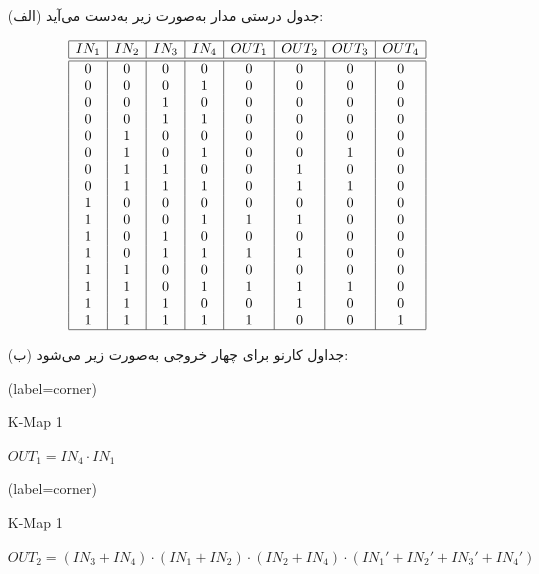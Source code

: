 \begin{enumerate}
	\item [(الف)]
	جدول درستی مدار به‌صورت زیر به‌دست می‌آید:
	
	
	\begin{latin}
		\[
		\begin{array}{|c|c|c|c|c|c|c|c|c|}
			\hline
			IN_1 & IN_2 & IN_3 & IN_4 & OUT_1 & OUT_2 & OUT_3 & OUT_4 \\
			\hline\hline
			0 & 0 & 0 & 0 & 0 & 0 & 0 & 0 \\
			0 & 0 & 0 & 1 & 0 & 0 & 0 & 0 \\
			0 & 0 & 1 & 0 & 0 & 0 & 0 & 0 \\
			0 & 0 & 1 & 1 & 0 & 0 & 0 & 0 \\
			0 & 1 & 0 & 0 & 0 & 0 & 0 & 0 \\
			0 & 1 & 0 & 1 & 0 & 0 & 1 & 0 \\
			0 & 1 & 1 & 0 & 0 & 1 & 0 & 0 \\
			0 & 1 & 1 & 1 & 0 & 1 & 1 & 0 \\
			1 & 0 & 0 & 0 & 0 & 0 & 0 & 0 \\ 
			1 & 0 & 0 & 1 & 1 & 1 & 0 & 0 \\
			1 & 0 & 1 & 0 & 0 & 0 & 0 & 0 \\
			1 & 0 & 1 & 1 & 1 & 1 & 0 & 0 \\
			1 & 1 & 0 & 0 & 0 & 0 & 0 & 0 \\
			1 & 1 & 0 & 1 & 1 & 1 & 1 & 0 \\
			1 & 1 & 1 & 0 & 0 & 1 & 0 & 0 \\
			1 & 1 & 1 & 1 & 1 & 0 & 0 & 1 \\
			\hline
		\end{array}
		\]
	\end{latin}
	
	
	
	
	\item [(ب)]
	جداول کارنو برای چهار خروجی به‌صورت زیر می‌شود:
	
	\begin{latin}
		\begin{minipage}{0.48\textwidth}
			\centering
			\begin{karnaugh-map}[4][4][1][$IN_2$][$IN_1$][$IN_4$][$IN_3$](label=corner)
			\end{karnaugh-map}
			\caption{K-Map 1}
			$OUT_1=IN_4 \cdot IN_1$
		\end{minipage}
		\hfill
		\begin{minipage}{0.48\textwidth}
			\centering
			\begin{karnaugh-map}[4][4][1][$IN_2$][$IN_1$][$IN_4$][$IN_3$](label=corner)
				\implicantcorner
			\end{karnaugh-map}
			\caption{K-Map 1}
			$OUT_2=(IN_3 + IN_4) \cdot (IN_1 + IN_2) \cdot (IN_2 + IN_4) \cdot (IN_1'+IN_2'+IN_3'+IN_4')$
		\end{minipage}	
	\end{latin}
	

\end{enumerate}
